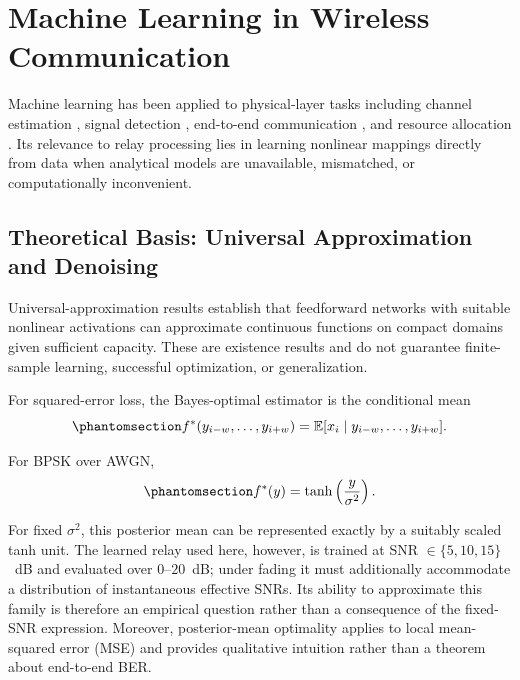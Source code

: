 \section{Machine Learning in Wireless Communication}\label{sec:machine-learning-in-wireless-communication}

Machine learning has been applied to physical-layer tasks including channel estimation \cite{YeLiJuang2018OFDMDL}, signal detection \cite{SamuelDiskinWunder2019MIMODetect}, end-to-end communication \cite{Dorner2018OverTheAirDL}, and resource allocation \cite{Sun2018LearnToOptimize}. Its relevance to relay processing lies in learning nonlinear mappings directly from data when analytical models are unavailable, mismatched, or computationally inconvenient.

\subsection{Theoretical Basis: Universal Approximation and Denoising}\label{sec:theoretical-basis-universal-approximation-and-denoising}

Universal-approximation results \cite{Cybenko1989UAT,Hornik1991UAT,GoodfellowBengioCourville2016DeepLearning} establish that feedforward networks with suitable nonlinear activations can approximate continuous functions on compact domains given sufficient capacity. These are existence results and do not guarantee finite-sample learning, successful optimization, or generalization.

For squared-error loss, the Bayes-optimal estimator is the conditional mean
\begin{equation}\protect\phantomsection\label{eq:optimal-denoiser}
f^*(y_{i-w},\ldots,y_{i+w})
=
\mathbb{E}[x_i\mid y_{i-w},\ldots,y_{i+w}] .
\end{equation}

For BPSK over AWGN,
\begin{equation}\protect\phantomsection\label{eq:optimal-denoiser-awgn}
f^*(y)=\tanh\left(\frac{y}{\sigma^2}\right).
\end{equation}

For fixed \(\sigma^2\), this posterior mean can be represented exactly by a suitably scaled tanh unit. The learned relay used here, however, is trained at SNR \(\in\{5,10,15\}\)~dB and evaluated over \(0\)--\(20\)~dB; under fading it must additionally accommodate a distribution of instantaneous effective SNRs. Its ability to approximate this family is therefore an empirical question rather than a consequence of the fixed-SNR expression. Moreover, posterior-mean optimality applies to local mean-squared error (MSE) and provides qualitative intuition rather than a theorem about end-to-end BER.

